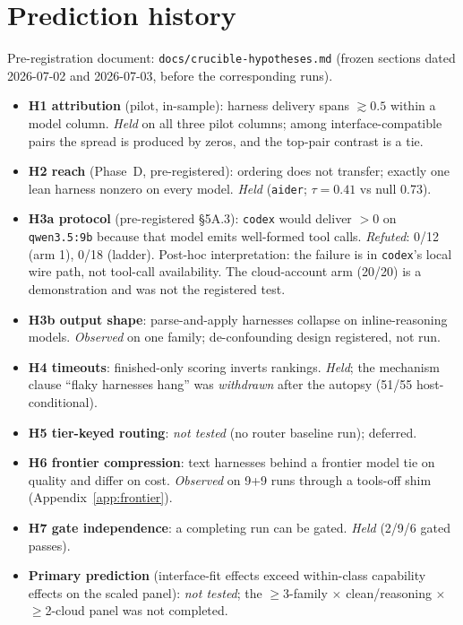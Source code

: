 \documentclass[10pt]{article}
\begin{document}
\section{Prediction history}
\label{app:predictions}
Pre-registration document: \texttt{docs/crucible-hypotheses.md} (frozen sections dated 2026-07-02
and 2026-07-03, before the corresponding runs).
\begin{itemize}
\item \textbf{H1 attribution} (pilot, in-sample): harness delivery spans $\gtrsim 0.5$ within a
  model column. \emph{Held} on all three pilot columns; among interface-compatible pairs the spread is
  produced by zeros, and the top-pair contrast is a tie.
\item \textbf{H2 reach} (Phase~D, pre-registered): ordering does not transfer; exactly one lean
  harness nonzero on every model. \emph{Held} (\texttt{aider}; $\tau{=}0.41$ vs null 0.73).
\item \textbf{H3a protocol} (pre-registered §5A.3): \texttt{codex} would deliver $>0$ on
  \texttt{qwen3.5:9b} because that model emits well-formed tool calls. \emph{Refuted}: 0/12 (arm 1),
  0/18 (ladder). Post-hoc interpretation: the failure is in \texttt{codex}'s local wire path, not
  tool-call availability. The cloud-account arm (20/20) is a demonstration and was not the
  registered test.
\item \textbf{H3b output shape}: parse-and-apply harnesses collapse on inline-reasoning models.
  \emph{Observed} on one family; de-confounding design registered, not run.
\item \textbf{H4 timeouts}: finished-only scoring inverts rankings. \emph{Held}; the mechanism clause
  ``flaky harnesses hang'' was \emph{withdrawn} after the autopsy (51/55 host-conditional).
\item \textbf{H5 tier-keyed routing}: \emph{not tested} (no router baseline run); deferred.
\item \textbf{H6 frontier compression}: text harnesses behind a frontier model tie on quality and
  differ on cost. \emph{Observed} on 9+9 runs through a tools-off shim (Appendix~\ref{app:frontier}).
\item \textbf{H7 gate independence}: a completing run can be gated. \emph{Held} (2/9/6 gated
  passes).
\item \textbf{Primary prediction} (interface-fit effects exceed within-class capability effects on
  the scaled panel): \emph{not tested}; the $\geq$3-family $\times$ clean/reasoning $\times$
  $\geq$2-cloud panel was not completed.
\end{itemize}
\end{document}
